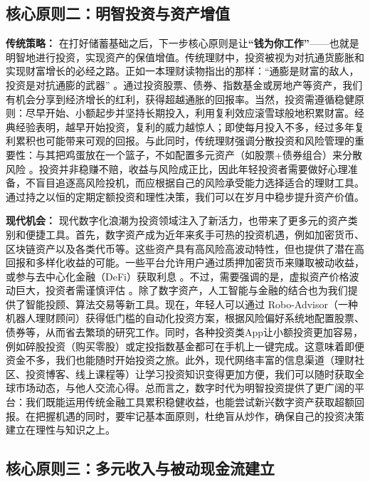 \documentclass[
  12pt]{article}
\begin{document}
\hypertarget{ux6838ux5fc3ux539fux5219ux4e8cux660eux667aux6295ux8d44ux4e0eux8d44ux4ea7ux589eux503c}{%
\subsection{核心原则二：明智投资与资产增值}\label{ux6838ux5fc3ux539fux5219ux4e8cux660eux667aux6295ux8d44ux4e0eux8d44ux4ea7ux589eux503c}}

\textbf{传统策略：}
在打好储蓄基础之后，下一步核心原则是让\textbf{``钱为你工作''}------也就是明智地进行投资，实现资产的保值增值。传统理财中，投资被视为对抗通货膨胀和实现财富增长的必经之路。正如一本理财读物指出的那样：``通膨是财富的敌人，投资是对抗通膨的武器''
\cite{ref3}。通过投资股票、债券、指数基金或房地产等资产，我们有机会分享到经济增长的红利，获得超越通胀的回报率。当然，投资需遵循稳健原则：尽早开始、小额起步并坚持长期投入，利用复利效应滚雪球般地积累财富。经典经验表明，越早开始投资，复利的威力越惊人；即使每月投入不多，经过多年复利累积也可能带来可观的回报。与此同时，传统理财强调分散投资和风险管理的重要性：与其把鸡蛋放在一个篮子，不如配置多元资产（如股票+债券组合）来分散风险
\cite{ref3}。投资并非稳赚不赔，收益与风险成正比，因此年轻投资者需要做好心理准备，不盲目追逐高风险投机，而应根据自己的风险承受能力选择适合的理财工具。通过持之以恒的定期定额投资和理性决策，我们可以在岁月中稳步提升资产价值。

\textbf{现代机会：}
现代数字化浪潮为投资领域注入了新活力，也带来了更多元的资产类别和便捷工具。首先，数字资产成为近年来炙手可热的投资机遇，例如加密货币、区块链资产以及各类代币等。这些资产具有高风险高波动特性，但也提供了潜在高回报和多样化收益的可能。一些平台允许用户通过质押加密货币来赚取被动收益，或参与去中心化金融（DeFi）获取利息
\cite{ref5}。不过，需要强调的是，虚拟资产价格波动巨大，投资者需谨慎评估
\cite{ref5}。除了数字资产，人工智能与金融的结合也为我们提供了智能投顾、算法交易等新工具。现在，年轻人可以通过
Robo-Advisor（一种机器人理财顾问）获得低门槛的自动化投资方案，根据风险偏好系统地配置股票、债券等，从而省去繁琐的研究工作。同时，各种投资类App让小额投资更加容易，例如碎股投资（购买零股）或定投指数基金都可在手机上一键完成。这意味着即便资金不多，我们也能随时开始投资之旅。此外，现代网络丰富的信息渠道（理财社区、投资博客、线上课程等）让学习投资知识变得更加方便，我们可以随时获取全球市场动态，与他人交流心得。总而言之，数字时代为明智投资提供了更广阔的平台：我们既能运用传统金融工具累积稳健收益，也能尝试新兴数字资产获取超额回报。在把握机遇的同时，要牢记基本面原则，杜绝盲从炒作，确保自己的投资决策建立在理性与知识之上。

\hypertarget{ux6838ux5fc3ux539fux5219ux4e09ux591aux5143ux6536ux5165ux4e0eux88abux52a8ux73b0ux91d1ux6d41ux5efaux7acb}{%
\subsection{核心原则三：多元收入与被动现金流建立}\label{ux6838ux5fc3ux539fux5219ux4e09ux591aux5143ux6536ux5165ux4e0eux88abux52a8ux73b0ux91d1ux6d41ux5efaux7acb}}
\end{document}
